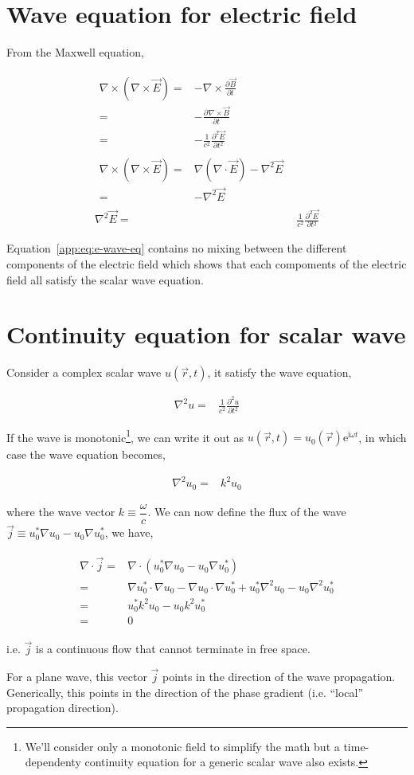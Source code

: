 \documentclass[10pt,fleqn]{article}
\newcommand{\ue}{\mathrm{e}}
\newcommand{\ui}{\mathrm{i}}
\newcommand{\eqar}[1]
{
  \begin{align}
    #1
  \end{align}
}
\newcommand{\paren}[1]{{\left({#1}\right)}}
\newcommand{\pdiff}[3][{}]{{\frac{\partial^{#1} {#2}}{\partial {#3}{}^{#1}}}}
\begin{document}
\clearpage
\appendix
\section{Wave equation for electric field}
\label{app:wave-eq}
From the Maxwell equation,
\eqar{
  \begin{split}
    \nabla\times\paren{\nabla\times\vec E}=&-\nabla\times\pdiff{\vec B}{t}\\
    =&-\pdiff{\nabla\times\vec B}{t}\\
    =&-\frac{1}{c^2}\pdiff[2]{\vec E}{t}
  \end{split}\\
  \begin{split}
    \nabla\times\paren{\nabla\times\vec E}
    =&\nabla\paren{\nabla\cdot\vec E}-\nabla^2\vec E\\
    =&-\nabla^2\vec E
  \end{split}\\
  \nabla^2\vec E=&\frac{1}{c^2}\pdiff[2]{\vec E}{t}\label{app:eq:e-wave-eq}
}
Equation~\ref{app:eq:e-wave-eq} contains no mixing between the different components
of the electric field which shows that each compoments of the electric field
all satisfy the scalar wave equation.

\section{Continuity equation for scalar wave}
\label{app:wave-flux}
Consider a complex scalar wave $u(\vec r, t)$, it satisfy the wave equation,
\eqar{
  \nabla^2u=&\frac{1}{c^2}\pdiff[2]{u}{t}
}
If the wave is monotonic\footnote{
  We'll consider only a monotonic field to simplify the math but a time-dependenty
  continuity equation for a generic scalar wave also exists.},
we can write it out as $u(\vec r, t)=u_0(\vec r)\ue^{\ui\omega t}$,
in which case the wave equation becomes,
\eqar{
  \nabla^2u_0=&k^2 u_0
}
where the wave vector $k\equiv\dfrac{\omega}{c}$.
We can now define the flux of the wave $\vec j\equiv u_0^*\nabla u_0-u_0\nabla u_0^*$,
we have,
\eqar{
  \begin{split}
    \nabla\cdot\vec j=&\nabla\cdot\paren{u_0^*\nabla u_0-u_0\nabla u_0^*}\\
    =&\nabla u_0^*\cdot\nabla u_0-\nabla u_0\cdot\nabla u_0^*+u_0^*\nabla^2 u_0-u_0\nabla^2 u_0^*\\
    =&u_0^*k^2 u_0-u_0k^2 u_0^*\\
    =&0
  \end{split}
}
i.e. $\vec j$ is a continuous flow that cannot terminate in free space.

For a plane wave, this vector $\vec j$ points in the direction of the wave propagation.
Generically, this points in the direction of the phase gradient
(i.e. ``local'' propagation direction).
\end{document}
